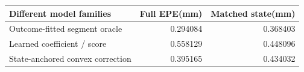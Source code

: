 \begin{tabular}{lrr}
\toprule
Different model families & Full EPE(mm) & Matched state(mm)\\
\midrule
Outcome-fitted segment oracle & 0.294084 & 0.368403\\
Learned coefficient / score & 0.558129 & 0.448096\\
State-anchored convex correction & 0.395165 & 0.434032\\
\bottomrule
\end{tabular}
